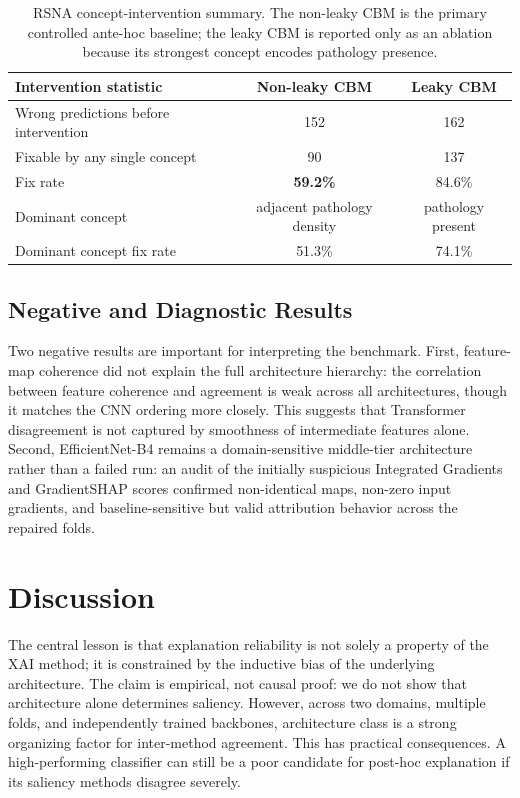 \documentclass{bmvc2k}
\begin{document}
\begin{table}[t]
\centering
\small
\begin{tabular}{lcc}
\toprule
Intervention statistic & Non-leaky CBM & Leaky CBM\\
\midrule
Wrong predictions before intervention & 152 & 162\\
Fixable by any single concept & 90 & 137\\
Fix rate & \textbf{59.2\%} & 84.6\%\\
Dominant concept & adjacent pathology density & pathology present\\
Dominant concept fix rate & 51.3\% & 74.1\%\\
\bottomrule
\end{tabular}
\caption{RSNA concept-intervention summary. The non-leaky CBM is the primary controlled ante-hoc baseline; the leaky CBM is reported only as an ablation because its strongest concept encodes pathology presence.}
\label{tab:cbm}
\end{table}

\subsection{Negative and Diagnostic Results}

Two negative results are important for interpreting the benchmark. First, feature-map coherence did not explain the full architecture hierarchy: the correlation between feature coherence and agreement is weak across all architectures, though it matches the CNN ordering more closely. This suggests that Transformer disagreement is not captured by smoothness of intermediate features alone. Second, EfficientNet-B4 remains a domain-sensitive middle-tier architecture rather than a failed run: an audit of the initially suspicious Integrated Gradients and GradientSHAP scores confirmed non-identical maps, non-zero input gradients, and baseline-sensitive but valid attribution behavior across the repaired folds.

\section{Discussion}

The central lesson is that explanation reliability is not solely a property of the XAI method; it is constrained by the inductive bias of the underlying architecture. The claim is empirical, not causal proof: we do not show that architecture alone determines saliency. However, across two domains, multiple folds, and independently trained backbones, architecture class is a strong organizing factor for inter-method agreement. This has practical consequences. A high-performing classifier can still be a poor candidate for post-hoc explanation if its saliency methods disagree severely.
\end{document}
